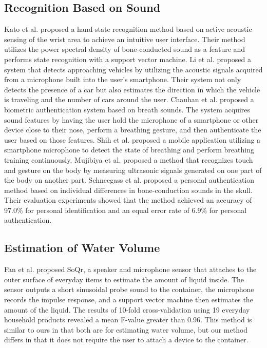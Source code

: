 \documentclass[sigconf,authordraft]{acmart}
\begin{document}
\subsection{Recognition Based on Sound}
Kato et al.\cite{sound_sensing1} proposed a hand-state recognition method based on active acoustic sensing of the wrist area to achieve an intuitive user interface. Their method utilizes the power spectral density of bone-conducted sound as a feature and performs state recognition with a support vector machine.
Li et al.\cite{Auto++} proposed a system that detects approaching vehicles by utilizing the acoustic signals acquired from a microphone built into the user's smartphone. Their system not only detects the presence of a car but also estimates the direction in which the vehicle is traveling and the number of cars around the user.
Chauhan et al.\cite{BreathPrint} proposed a biometric authentication system based on breath sounds. The system acquires sound features by having the user hold the microphone of a smartphone or other device close to their nose, perform a breathing gesture, and then authenticate the user based on those features.
Shih et al.\cite{Breeze} proposed a mobile application utilizing a smartphone microphone to detect the state of breathing and perform breathing training continuously.
Mujibiya et al.\cite{sound_sensing2} proposed a method that recognizes touch and gesture on the body by measuring ultrasonic signals generated on one part of the body on another part.
Schneegass et al.\cite{SkullConduct} proposed a personal authentication method based on individual differences in bone-conduction sounds in the skull. Their evaluation experiments showed that the method achieved an accuracy of 97.0\% for personal identification and an equal error rate of 6.9\% for personal authentication.


\subsection{Estimation of Water Volume}
Fan et al.\cite{SoQr} proposed SoQr, a speaker and microphone sensor that attaches to the outer surface of everyday items to estimate the amount of liquid inside. The sensor outputs a short sinusoidal probe sound to the container, the microphone records the impulse response, and a support vector machine then estimates the amount of the liquid. The results of 10-fold cross-validation using 19 everyday household products revealed a mean F-value greater than 0.96.
This method is similar to ours in that both are for estimating water volume, but our method differs in that it does not require the user to attach a device to the container.
\end{document}
